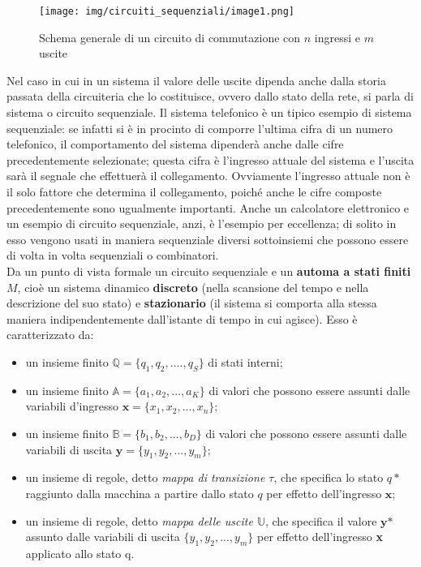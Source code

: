 \documentclass[a4paper]{extarticle}
\begin{document}
\begin{figure}[H]
    \centering
        \texttt{[image: img/circuiti\_sequenziali/image1.png]}
    \caption{Schema generale di un circuito di commutazione con \(n\) ingressi e \(m\) uscite}
    \label{fig:schema_circuito_commutazione}
\end{figure}

\noindent
Nel caso in cui in un sistema il valore delle uscite dipenda anche dalla storia passata della circuiteria che lo costituisce, ovvero dallo stato della rete, si parla di sistema o circuito sequenziale. Il sistema telefonico è un tipico esempio di sistema sequenziale: se infatti si è in procinto di comporre l’ultima cifra di un numero telefonico, il comportamento del sistema dipenderà anche dalle cifre precedentemente selezionate; questa cifra è l’ingresso attuale del sistema e l’uscita sarà il segnale che effettuerà il collegamento. Ovviamente l’ingresso attuale non è il solo fattore che determina il collegamento, poiché anche le cifre composte precedentemente sono ugualmente importanti. Anche un calcolatore elettronico e un esempio di circuito sequenziale, anzi, è l’esempio per eccellenza; di solito in esso vengono usati in maniera sequenziale diversi sottoinsiemi che possono essere di volta in volta sequenziali o combinatori.\\
Da un punto di vista formale un circuito sequenziale e un \textbf{automa a stati finiti} \(M\), cioè un sistema dinamico \textbf{discreto} (nella scansione del tempo e nella descrizione del suo stato) e \textbf{stazionario} (il sistema si comporta alla stessa maniera indipendentemente dall’istante di tempo in cui agisce). Esso è caratterizzato da:
\begin{itemize}
    \item un insieme finito \(\mathbb{Q} = \{q_1, q_2, ...., q_S\}\) di stati interni;
    \item un insieme finito \(\mathbb{A} = \{a_1, a_2, ..., a_K\}\) di valori che possono essere assunti dalle variabili d’ingresso \(\textbf{x} = \{x_1, x_2, ..., x_n\}\);
    \item un insieme finito \(\mathbb{B} = \{b_1, b_2, ..., b_D\}\) di valori che possono essere assunti dalle variabili di uscita \(\textbf{y} = \{y_1, y_2, ..., y_m\}\);
    \item un insieme di regole, detto \textit{mappa di transizione \(\tau\)}, che specifica lo stato \(q*\) raggiunto dalla macchina a partire dallo stato \(q\) per effetto dell’ingresso \(\textbf{x}\);
    \item un insieme di regole, detto \textit{mappa delle uscite \(\mathbb{U}\)}, che specifica il valore \(\textbf{y*}\) assunto dalle variabili di uscita \(\{y_1, y_2, ..., y_m\}\) per effetto dell'ingresso \textbf{x} applicato allo stato q.
\end{itemize}
\end{document}
